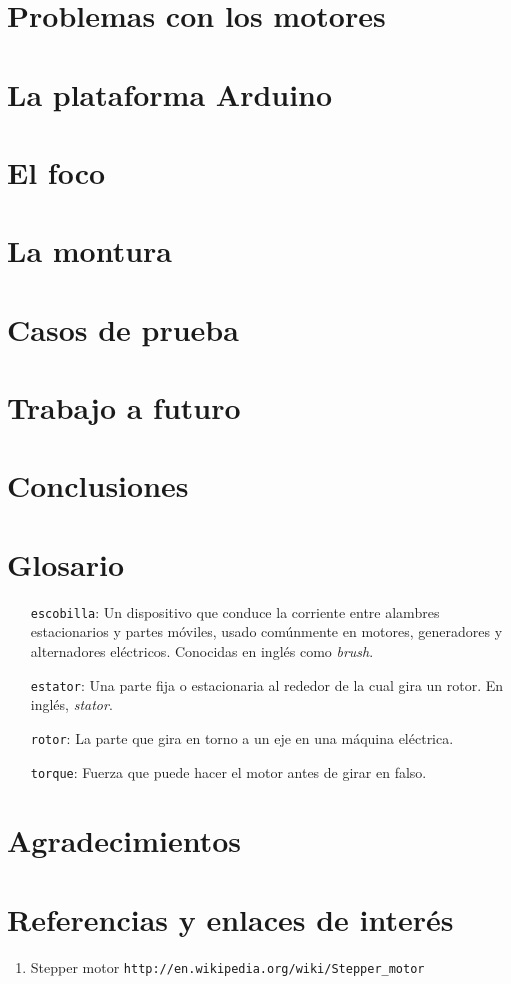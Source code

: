 \documentclass[final,narroweqnarray,inline,twoside]{ieee}
\begin{document}
\section{Problemas con los motores}
\section{La plataforma Arduino}
\section{El foco}
\section{La montura}
\section{Casos de prueba}
\section{Trabajo a futuro}
\section{Conclusiones}
\section{Glosario}
\begin{enumerate}
 \item[\texttt{escobilla}:] Un dispositivo que conduce la corriente entre alambres estacionarios y partes móviles, usado
comúnmente en motores, generadores y alternadores eléctricos. Conocidas en inglés como \textit{brush}.
 \item[\texttt{estator}:] Una parte fija o estacionaria al rededor de la cual gira un rotor. En inglés, \textit{stator}.
 \item[\texttt{rotor}:] La parte que gira en torno a un eje en una máquina eléctrica.
 \item[\texttt{torque}:] Fuerza que puede hacer el motor antes de girar en falso.
\end{enumerate}

\section{Agradecimientos}

\section{Referencias y enlaces de interés}
\begin{enumerate}
\item Stepper motor\newline
\margin \texttt{http://en.wikipedia.org/wiki/Stepper\_motor}\\
\end{enumerate}
\end{document}
